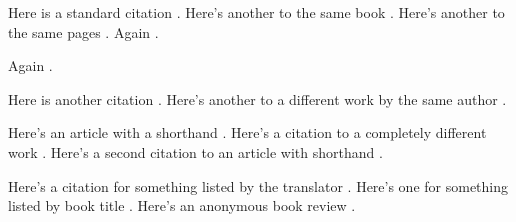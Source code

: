 \documentclass[12pt,draft]{article}
\begin{document}
	Here is a standard citation \autocite[32]{haggis99aa}.  Here's another to the same book \autocite[33--40]{haggis99aa}.  Here's another to the same pages \autocite[33--40]{haggis99aa}. 	Again \mancite\autocite[33--40]{haggis99aa}.
	
	Again \autocite[33--40]{haggis99aa}.
		
	Here is another citation \autocite[12]{askme06aa}.  Here's another to a different work by the same author \autocite[30]{askme92aa}.
	
	Here's an article with a shorthand \autocite[12]{taskme06aa}.  Here's a citation to a completely different work \autocite[32]{haggis99aa}. Here's a second citation to an article with shorthand \autocite[17]{taskme06aa}.
	
	Here's a citation for something listed by the translator \autocite[22]{coulson64aa}.  Here's one for something listed by book title \autocite[978]{octovian86aa}.  Here's an anonymous book review \autocite{danish1972aa}.

\nocite{*}
\newpage
\printbibliography[heading=bibintoc]
\end{document}
